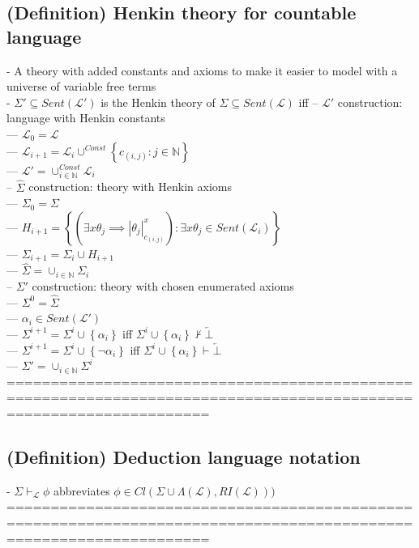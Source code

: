 \documentclass{book}
\newcommand{\inot}{\not}
\newcommand{\contr}{\overleftarrow{\bot}}
\newcommand{\set}[1]{\left\{ #1 \right\}}
\newcommand{\sub}[3]{\left|#1\right|_{#3}^{#2}}
\begin{document}
\subsection{(Definition) Henkin theory for countable language}
	- A theory with added constants and axioms to make it easier to model with a universe of variable free terms \\
	- $\Sigma' \subseteq Sent(\mathcal{L}')$ is the Henkin theory of $\Sigma \subseteq Sent(\mathcal{L})$ iff 
		-- $\mathcal{L}'$ construction: language with Henkin constants \\
			--- $\mathcal{L}_0 = \mathcal{L}$ \\
			--- $\mathcal{L}_{i+1} = \mathcal{L}_{i} \cup^{Const} \set{c_{(i, j)}: j \in \mathbb{N}}$ \\
			--- $\mathcal{L}' = \cup^{Const}_{i \in \mathbb{N}} \mathcal{L}_i$ \\
		-- $\hat{\Sigma}$ construction: theory with Henkin axioms \\
			--- $\Sigma_0 = \Sigma$ \\
			--- $H_{i+1} = \set{(\exists x \theta_j \implies \sub{\theta_j}{x}{c_{(i, j)}}): \exists x \theta_j \in Sent(\mathcal{L}_i)}$ \\
			--- $\Sigma_{i+1} = \Sigma_i \cup H_{i+1}$ \\
			--- $\hat{\Sigma} = \cup_{i \in \mathbb{N}} \Sigma_i$ \\
		-- $\Sigma'$ construction: theory with chosen enumerated axioms \\
			--- $\Sigma^0 = \hat{\Sigma}$ \\
			--- $\alpha_i \in Sent(\mathcal{L}')$ \\
			--- $\Sigma^{i+1} = \Sigma^i \cup \set{\alpha_i}$ iff $\Sigma^i \cup \set{\alpha_i} \inot \vdash \contr$ \\
			--- $\Sigma^{i+1} = \Sigma^i \cup \set{\lnot \alpha_i}$ iff $\Sigma^i \cup \set{\alpha_i} \vdash \contr$ \\
			--- $\Sigma' = \cup_{i \in \mathbb{N}} \Sigma^i$ \\
	===================================================================================================================
\subsection{(Definition) Deduction language notation}
	- $\Sigma \vdash_{\mathcal{L}} \phi$ abbreviates $\phi \in Cl(\Sigma \cup \Lambda(\mathcal{L}), RI(\mathcal{L})))$ \\
	===================================================================================================================
\end{document}
